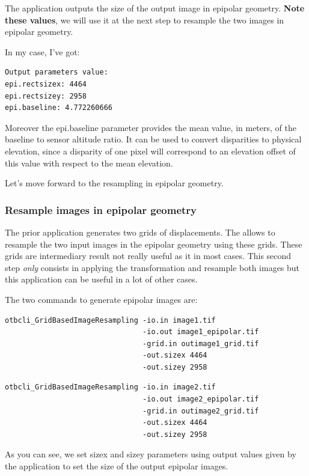 The application outputs the size of the output image in epipolar
geometry. \textbf{Note these values}, we will use it at the next step to
resample the two images in epipolar geometry.

In my case, I've got:

\begin{verbatim}
Output parameters value:
epi.rectsizex: 4464
epi.rectsizey: 2958
epi.baseline: 4.772260666
\end{verbatim}

Moreover the epi.baseline parameter provides the mean value, in meters, of the
baseline to sensor altitude ratio. It can be used to convert disparities to
physical elevation, since a disparity of one pixel will correspond to an
elevation offset of this value with respect to the mean elevation.

Let's move forward to the resampling in epipolar geometry.

\subsubsection{Resample images in epipolar geometry}

The prior application generates two grids of displacements. The
 allows to resample the two input images
in the epipolar geometry using these grids.  These grids are intermediary result
not really useful as it in most cases. This second step \textit{only} consists in
applying the transformation and resample both images but this application can be
useful in a lot of other cases.

The two commands to generate epipolar images are:
\begin{verbatim}
otbcli_GridBasedImageResampling -io.in image1.tif
                                -io.out image1_epipolar.tif
                                -grid.in outimage1_grid.tif
                                -out.sizex 4464
                                -out.sizey 2958
\end{verbatim}

\begin{verbatim}
otbcli_GridBasedImageResampling -io.in image2.tif
                                -io.out image2_epipolar.tif
                                -grid.in outimage2_grid.tif
                                -out.sizex 4464
                                -out.sizey 2958
\end{verbatim}

As you can see, we set sizex and sizey parameters using output values given by
the  application to set the size
of the output epipolar images.

